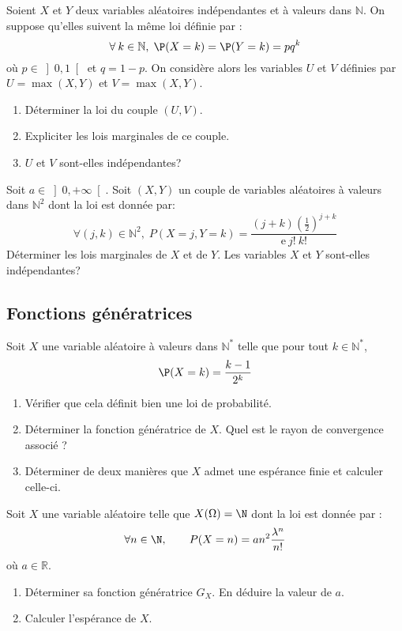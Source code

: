 \documentclass[a4paper,twoside,french,11pt]{VcCours}
\begin{document}
\begin{Exercice}{} Soient $X$ et $Y$ deux variables aléatoires indépendantes et à valeurs dans $\mathbb{N}$. On suppose qu'elles suivent la même loi définie par :
$$\forall\:k\in\mathbb{N}, \; \P(X=k)=\P(Y=k)=pq^k$$
où $p \in \left] 0,1\right[$ et $q=1-p$. On considère alors les variables $U$ et $V$ définies par $U=\max(X,Y)$ et $V=\max(X,Y)$.
\begin{enumerate}
\item
Déterminer la loi du couple $(U,V)$.
\item
Expliciter les lois marginales de ce couple.
\item
$U$ et $V$ sont-elles indépendantes?
\end{enumerate}
\end{Exercice}


\begin{Exercice}{} Soit $a\in {\left] 0,+\infty\right[ }$. Soit $(X,Y)$ un couple de variables aléatoires à valeurs dans $\mathbb{N}^2$ dont la loi est donnée par: 
$$\forall (j,k)\in {\mathbb{N}^2}, \; P(X=j,Y=k)=\dfrac{(j+k)\left( \tfrac{1}{2}\right) ^{j+k}}{\mathrm{e}\:j!\:k!}$$
Déterminer les lois marginales de $X$ et de $Y$. Les variables $X$ et $Y$ sont-elles indépendantes?
\end{Exercice}

\newpage


\subsection{Fonctions génératrices}


\begin{Exercice}{}  Soit $X$ une variable aléatoire à valeurs dans $\mathbb{N}^*$ telle que pour tout $k \in \mathbb{N}^*$,
$$ \P(X=k) = \dfrac{k-1}{2^k}$$

\begin{enumerate}
\item Vérifier que cela définit bien une loi de probabilité.
\item Déterminer la fonction génératrice de $X$. Quel est le rayon de convergence associé ?
\item Déterminer de deux manières que $X$ admet une espérance finie et calculer celle-ci.
\end{enumerate}
\end{Exercice}

\begin{Exercice}{} Soit $X$ une variable aléatoire telle que $X(\Omega)=\N$ dont la loi est donnée par :
$$\forall n\in\N,\qquad P(X=n)=an^2\frac{\lambda^n}{n!}$$
où $a \in \mathbb{R}$.
\begin{enumerate}
	\item Déterminer sa fonction génératrice $G_X.$ En déduire la valeur de $a.$
	
	\item Calculer l'espérance de $X.$
\end{enumerate}
\end{Exercice}
\end{document}
